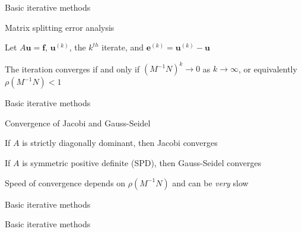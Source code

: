 \documentclass[18pt,xcolor=table]{beamer}
\begin{document}
\begin{frame}{Basic iterative methods}
\begin{block}{Matrix splitting error analysis}
\bit
\item Let $A\mathbf{u} = \mathbf{f}$, $\mathbf{u}^{(k)}$, the $k^{th}$ iterate, and $\mathbf{e}^{(k)} = \mathbf{u}^{(k)} - \mathbf{u}$
\eit
{}
\bit
\item The iteration converges if and only if $(M^{-1}N)^k \rightarrow 0$ as $k\rightarrow \infty$, or equivalently $\rho (M^{-1}N) < 1$
\eit
\end{block}
\end{frame}

\begin{frame}{Basic iterative methods}
\begin{block}{Convergence of Jacobi and Gauss-Seidel}
\bit
\item If $A$ is strictly diagonally dominant, then Jacobi converges
\item If $A$ is symmetric positive definite (SPD), then Gauss-Seidel converges
\item Speed of convergence depends on $\rho (M^{-1}N)$ and can be \emph{very} slow
\eit
\end{block}
\end{frame}

\begin{frame}{Basic iterative methods}
\begin{block}{}
\bit
\item 
\eit
\end{block}
\end{frame}

\begin{frame}{Basic iterative methods}
\begin{block}{}
\bit
\item 
\eit
\end{block}
\end{frame}


\end{document}
